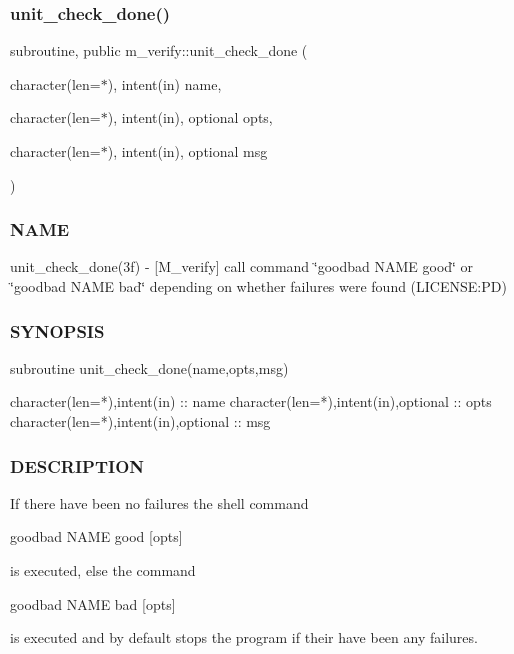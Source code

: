 \subsubsection{\texorpdfstring{unit\+\_\+check\+\_\+done()}{unit\_check\_done()}}
{\footnotesize\ttfamily subroutine, public m\+\_\+verify\+::unit\+\_\+check\+\_\+done (\begin{DoxyParamCaption}\item[{character(len=$\ast$), intent(in)}]{name,  }\item[{character(len=$\ast$), intent(in), optional}]{opts,  }\item[{character(len=$\ast$), intent(in), optional}]{msg }\end{DoxyParamCaption})}



\subsubsection*{N\+A\+ME}

unit\+\_\+check\+\_\+done(3f) -\/ \mbox{[}M\+\_\+verify\mbox{]} call command \char`\"{}goodbad N\+A\+M\+E good\char`\"{} or \char`\"{}goodbad N\+A\+M\+E bad\char`\"{} depending on whether failures were found (L\+I\+C\+E\+N\+SE\+:PD) 

\subsubsection*{S\+Y\+N\+O\+P\+S\+IS}

\begin{DoxyVerb}subroutine unit_check_done(name,opts,msg)

 character(len=*),intent(in) :: name
 character(len=*),intent(in),optional :: opts
 character(len=*),intent(in),optional :: msg
\end{DoxyVerb}


\subsubsection*{D\+E\+S\+C\+R\+I\+P\+T\+I\+ON}

\begin{DoxyVerb}If there have been no failures the shell command

     goodbad NAME good [opts]

is executed, else the command

     goodbad NAME bad [opts]

is executed and by default stops the program if their have been
any failures.
\end{DoxyVerb}


